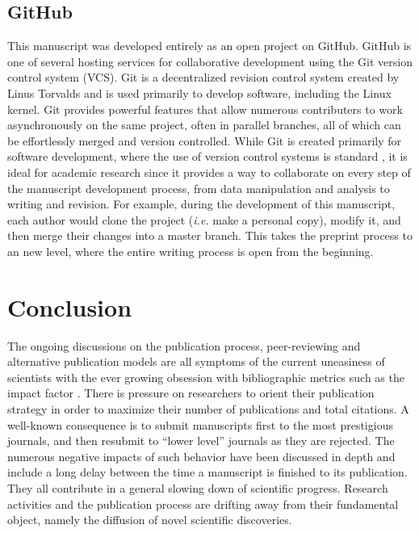 \documentclass[letterpaper,twocolumn,superscriptaddress,showkeys,longbibliography]{revtex4-1}
\begin{document}
\subsection{GitHub}

This manuscript was developed entirely as an open project on GitHub. GitHub is
one of several hosting services for collaborative development using the Git
version control system (VCS).  Git is a decentralized revision control system
created by Linus Torvalds and is used primarily to develop software, including
the Linux kernel. Git provides powerful features that allow numerous
contributers to work asynchronously on the same project, often in parallel
branches, all of which can be effortlessly merged and version controlled.  While
Git is created primarily for software development, where the use of version
control systems is standard \cite{aru12}, it is ideal for academic research
since it provides a way to collaborate on every step of the manuscript
development process, from data manipulation and analysis to writing and
revision. For example, during the development of this manuscript, each author
would clone the project (\emph{i.e.} make a personal copy), modify it, and then
merge their changes into a master branch. This takes the preprint process to an
new level, where the entire writing process is open from the beginning.

\section{Conclusion}

The ongoing discussions on the publication process, peer-reviewing and
alternative publication models are all symptoms of the current uneasiness of
scientists with the ever growing obsession with bibliographic metrics such as
the impact factor \cite{Fisher2012}. There is pressure on researchers to orient
their publication strategy in order to maximize their number of publications and
total citations. A well-known consequence is to submit manuscripts first to the
most prestigious journals, and then resubmit to ``lower level'' journals as they
are rejected. The numerous negative impacts of such behavior have been discussed
in depth \cite{hoc09} and include a long delay between the time a manuscript is
finished to its publication.  They all contribute in a general slowing down of
scientific progress.  Research activities and the publication process are
drifting away from their fundamental object, namely the diffusion of novel
scientific discoveries. 
\end{document}
